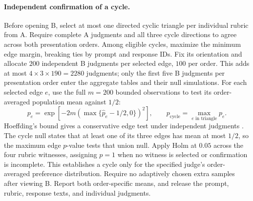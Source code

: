 \documentclass{article}
\theoremstyle{remark}
\theoremstyle{plain}
\begin{document}
\paragraph{Independent confirmation of a cycle.}
Before opening B, select at most one directed cyclic triangle per individual rubric from A. Require complete A judgments and all three cycle directions to agree across both presentation orders. Among eligible cycles, maximize the minimum edge margin, breaking ties by prompt and response IDs. Fix its orientation and allocate $200$ independent B judgments per selected edge, $100$ per order. This adds at most $4\times3\times190=2280$ judgments; only the first five B judgments per presentation order enter the aggregate tables and their null simulations. For each selected edge $e$, use the full $m=200$ bounded observations to test its order-averaged population mean against $1/2$:
\begin{equation}
p_e=\exp\!\left[-2m\left(\max\{\widehat p_e-1/2,0\}\right)^2\right],
\qquad p_{\mathrm{cycle}}=\max_{e\text{ in triangle}}p_e.
\label{eq:audit-cycle-test}
\end{equation}
Hoeffding's bound gives a conservative edge test under independent judgments \citep{hoeffding1963probability}. The cycle null states that at least one of its three edges has mean at most $1/2$, so the maximum edge $p$-value tests that union null. Apply Holm at $0.05$ across the four rubric witnesses, assigning $p=1$ when no witness is selected or confirmation is incomplete. This establishes a cycle only for the specified judge's order-averaged preference distribution. Require no adaptively chosen extra samples after viewing B. Report both order-specific means, and release the prompt, rubric, response texts, and individual judgments.
\end{document}
